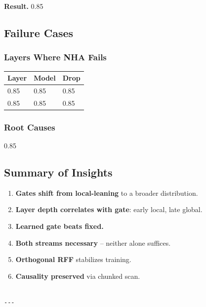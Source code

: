 \textbf{Result.} 0.85

\subsection{Failure Cases}

\subsubsection{Layers Where NHA Fails}

\begin{table}[H]
\centering
\small
\begin{tabular}{lll}
\toprule
\textbf{Layer} & \textbf{Model} & \textbf{Drop} \\
\midrule
0.85 & 0.85 & 0.85 \\
0.85 & 0.85 & 0.85 \\
\bottomrule
\end{tabular}
\end{table}

\subsubsection{Root Causes}

0.85

\subsection{Summary of Insights}

\begin{enumerate}
\item \textbf{Gates shift from local-leaning} to a broader distribution.
\item \textbf{Layer depth correlates with gate}: early local, late global.
\item \textbf{Learned gate beats fixed.}
\item \textbf{Both streams necessary} -- neither alone suffices.
\item \textbf{Orthogonal RFF} stabilizes training.
\item \textbf{Causality preserved} via chunked scan.
\end{enumerate}
\begin{lstlisting}

---
\end{lstlisting}
